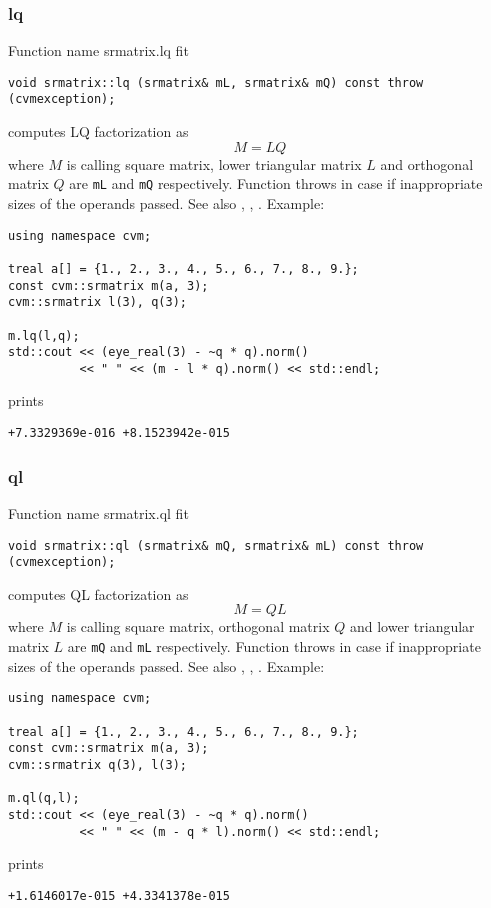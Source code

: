 \subsubsection{lq}
Function%
\pdfdest name {srmatrix.lq} fit
\begin{verbatim}
void srmatrix::lq (srmatrix& mL, srmatrix& mQ) const throw (cvmexception);
\end{verbatim}
computes LQ factorization as
\begin{equation*}
M=LQ
\end{equation*}
where 
$M$ is  calling square matrix, lower triangular matrix $L$ 
and orthogonal matrix $Q$ are \verb"mL" and \verb"mQ"
respectively. 
Function throws
in case if inappropriate sizes of the operands passed.
See also , ,
.
Example:
\begin{Verbatim}
using namespace cvm;

treal a[] = {1., 2., 3., 4., 5., 6., 7., 8., 9.};
const cvm::srmatrix m(a, 3);
cvm::srmatrix l(3), q(3);

m.lq(l,q);
std::cout << (eye_real(3) - ~q * q).norm()
          << " " << (m - l * q).norm() << std::endl;
\end{Verbatim}
prints
\begin{Verbatim}
+7.3329369e-016 +8.1523942e-015
\end{Verbatim}
\newpage


\subsubsection{ql}
Function%
\pdfdest name {srmatrix.ql} fit
\begin{verbatim}
void srmatrix::ql (srmatrix& mQ, srmatrix& mL) const throw (cvmexception);
\end{verbatim}
computes QL factorization as
\begin{equation*}
M=QL
\end{equation*}
where 
$M$ is  calling square matrix, orthogonal matrix $Q$ 
and lower triangular matrix $L$ are \verb"mQ" and \verb"mL"
respectively. 
Function throws
in case if inappropriate sizes of the operands passed.
See also , ,
.
Example:
\begin{Verbatim}
using namespace cvm;

treal a[] = {1., 2., 3., 4., 5., 6., 7., 8., 9.};
const cvm::srmatrix m(a, 3);
cvm::srmatrix q(3), l(3);

m.ql(q,l);
std::cout << (eye_real(3) - ~q * q).norm()
          << " " << (m - q * l).norm() << std::endl;
\end{Verbatim}
prints
\begin{Verbatim}
+1.6146017e-015 +4.3341378e-015
\end{Verbatim}
\newpage



